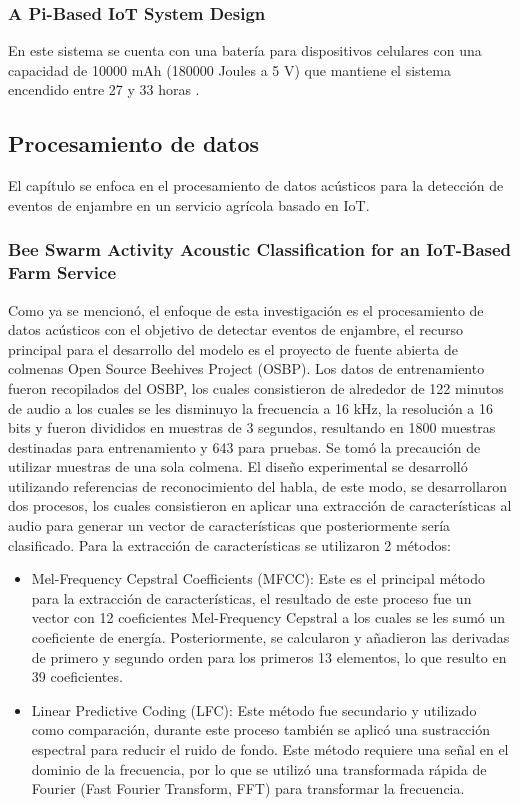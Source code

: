 \documentclass[journal]{IEEEtran} %
\begin{document}
\subsubsection{A Pi-Based IoT System Design}
En este sistema se cuenta con una batería para dispositivos celulares con una capacidad de 10000 mAh (180000 Joules a 5 V) que mantiene el sistema encendido entre 27 y 33 horas \cite{Chen2020ADesign}.
\subsection{Procesamiento de datos}
El capítulo se enfoca en el procesamiento de datos acústicos para la detección de eventos de enjambre en un servicio agrícola basado en IoT.
\subsubsection{Bee Swarm Activity Acoustic Classification for an IoT-Based Farm Service}
Como ya se mencionó, el enfoque de esta investigación es el procesamiento de datos acústicos con el objetivo de detectar eventos de enjambre, el recurso principal para el desarrollo del modelo es el proyecto de fuente abierta de colmenas Open Source Beehives Project (OSBP).
Los datos de entrenamiento fueron recopilados del OSBP, los cuales consistieron de alrededor de 122 minutos de audio a los cuales se les disminuyo la frecuencia a 16 kHz, la resolución a 16 bits y fueron divididos en muestras de 3 segundos, resultando en 1800 muestras destinadas para entrenamiento y 643 para pruebas. Se tomó la precaución de utilizar muestras de una sola colmena.
El diseño experimental se desarrolló utilizando referencias de reconocimiento del habla, de este modo, se desarrollaron dos procesos, los cuales consistieron en aplicar una extracción de características al audio para generar un vector de características que posteriormente sería clasificado.
Para la extracción de características se utilizaron 2 métodos:
\begin{itemize}
\item Mel-Frequency Cepstral Coefficients (MFCC): Este es el principal método para la extracción de características, el resultado de este proceso fue un vector con 12 coeficientes Mel-Frequency Cepstral a los cuales se les sumó un coeficiente de energía. Posteriormente, se calcularon y añadieron las derivadas de primero y segundo orden para los primeros 13 elementos, lo que resulto en 39 coeficientes.
\item Linear Predictive Coding (LFC): Este método fue secundario y utilizado como comparación, durante este proceso también se aplicó una sustracción espectral para reducir el ruido de fondo. Este método requiere una señal en el dominio de la frecuencia, por lo que se utilizó una transformada rápida de Fourier (Fast Fourier Transform, FFT) para transformar la frecuencia.
\end{itemize}
\end{document}
